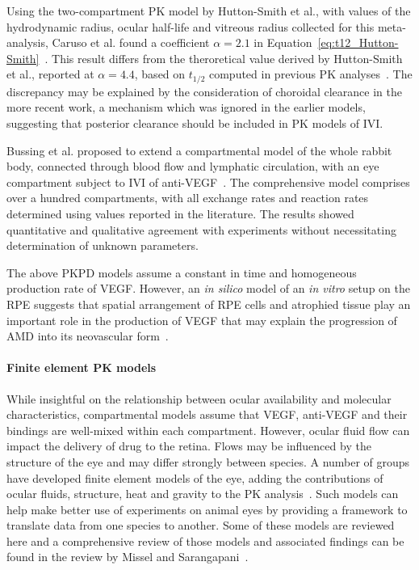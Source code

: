 \documentclass{article}
\begin{document}
Using the two-compartment PK model by Hutton-Smith et al., with values of the hydrodynamic radius, ocular half-life and vitreous radius collected for this meta-analysis, Caruso et al. found a coefficient $\alpha=2.1$ in Equation~\ref{eq:t12_Hutton-Smith}~\cite{Caruso_2020}.
This result differs from the theroretical value derived by Hutton-Smith et al., reported at $\alpha=4.4$, based on $t_{1/2}$ computed in previous PK analyses~\cite{HuttonSmith_2016}.
The discrepancy may be explained by the consideration of choroidal clearance in the more recent work, a mechanism which was ignored in the earlier models, suggesting that posterior clearance should be included in PK models of IVI.


Bussing et al. proposed to extend a compartmental model of the whole rabbit body, connected through blood flow and lymphatic circulation, with an eye compartment subject to IVI of anti-VEGF~\cite{Bussing_2020}.
The comprehensive model comprises over a hundred compartments, with all exchange rates and reaction rates determined using values reported in the literature.
The results showed quantitative and qualitative agreement with experiments without necessitating determination of unknown parameters. 

The above PKPD models assume a constant in time and homogeneous production rate of VEGF.
However, an \textit{in silico} model of an \textit{in vitro} setup on the RPE suggests that spatial arrangement of RPE cells and atrophied tissue play an important role in the production of VEGF that may explain the progression of AMD into its neovascular form~\cite{Baker_2017}.  

\paragraph*{Finite element PK models}

While insightful on the relationship between ocular availability and molecular characteristics, compartmental models assume that VEGF, anti-VEGF and their bindings are well-mixed within each compartment.
However, ocular fluid flow can impact the delivery of drug to the retina.
Flows may be influenced by the structure of the eye and may differ strongly between species.
A number of groups have developed finite element models of the eye, adding the contributions of ocular fluids, structure, heat and gravity to the PK analysis~\cite{Lamminsalo_2018, Missel_2012, Zhang_2018}.
Such models can help make better use of experiments on animal eyes by providing a framework to translate data from one species to another.
Some of these models are reviewed here and a comprehensive review of those models and associated findings can be found in the review by Missel and Sarangapani~\cite{Missel_2019}.
\end{document}
